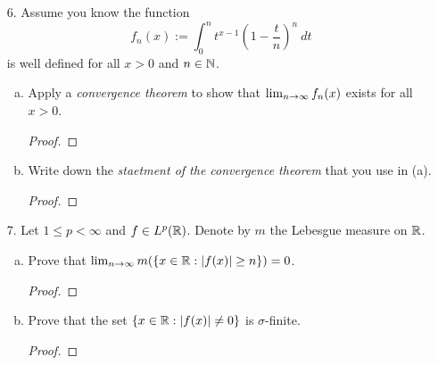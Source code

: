 \begin{itemize}
\begin{enumerate}[(a)]
\begin{proof}
    \end{proof}

    \item Let $m^*$ denote the Lebesgue outer measure on $\bbr$. Prove that for any two sets $A, B \subseteq \bbr$ such that $\inf_{a \in A, b \in B} |a - b| > 0$ we have
    $$m^*(A \cup B) = m^*(A) + m^*(B).$$
    \begin{proof}

    \end{proof}
\end{enumerate}







\item[6.] Assume you know the function
$$f_n(x) := \int_0^n t^{x-1} \left( 1 - \frac{t}{n} \right)^n \ dt$$
is well defined for all $x > 0$ and $n \in \mathbb{N}$.
\begin{enumerate}[(a)]
    \item Apply a \textit{convergence theorem} to show that $\lim_{n \rightarrow \infty} f_n(x)$ exists for all $x > 0$.
    \begin{proof}

    \end{proof}

    \item Write down the \textit{staetment of the convergence theorem} that you use in (a).
    \begin{proof}

    \end{proof}
\end{enumerate}






\item[7.] Let $1 \leq p < \infty$ and $f \in L^p(\mathbb{R})$. Denote by $m$ the Lebesgue measure on $\bbr$.
\begin{enumerate}[(a)]
    \item Prove that $\lim_{n \rightarrow \infty} m(\{x \in \mathbb{R} : |f(x)| \geq n\}) = 0$.
    \begin{proof}

    \end{proof}

    \item Prove that the set $\{x \in \mathbb{R} : |f(x)| \neq 0\}$ is $\sigma$-finite.
    \begin{proof}

    \end{proof}
    

\end{enumerate}
\end{itemize}
